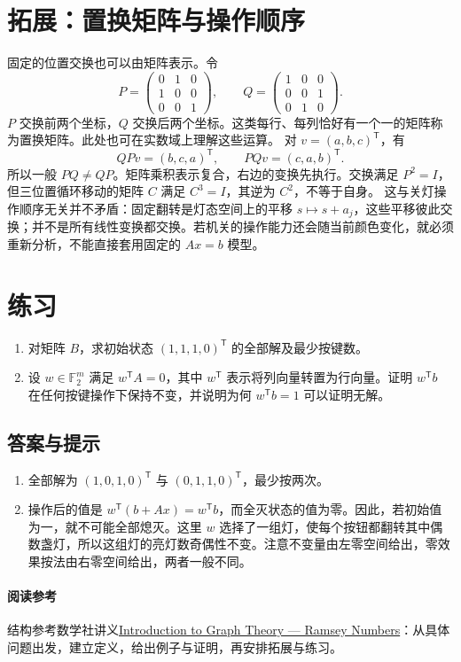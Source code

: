 \documentclass[UTF8,fontset=fandol,11pt,a4paper]{ctexart}
\newcommand{\F}{\mathbb F_2}
\begin{document}
\section{拓展：置换矩阵与操作顺序}
固定的位置交换也可以由矩阵表示。令
\[
 P=\begin{pmatrix}0&1&0\\1&0&0\\0&0&1\end{pmatrix},\qquad
 Q=\begin{pmatrix}1&0&0\\0&0&1\\0&1&0\end{pmatrix}.
\]
$P$ 交换前两个坐标，$Q$ 交换后两个坐标。这类每行、每列恰好有一个一的矩阵称为置换矩阵。此处也可在实数域上理解这些运算。
对 $v=(a,b,c)^{\mathsf T}$，有
\[QPv=(b,c,a)^{\mathsf T},\qquad PQv=(c,a,b)^{\mathsf T}.\]
所以一般 $PQ\ne QP$。矩阵乘积表示复合，右边的变换先执行。交换满足 $P^2=I$，但三位置循环移动的矩阵 $C$ 满足 $C^3=I$，其逆为 $C^2$，不等于自身。
这与关灯操作顺序无关并不矛盾：固定翻转是灯态空间上的平移 $s\mapsto s+a_j$，这些平移彼此交换；并不是所有线性变换都交换。若机关的操作能力还会随当前颜色变化，就必须重新分析，不能直接套用固定的 $Ax=b$ 模型。
\section{练习}
\begin{enumerate}
\item 对矩阵 $B$，求初始状态 $(1,1,1,0)^{\mathsf T}$ 的全部解及最少按键数。
\item 设 $w\in\F^m$ 满足 $w^{\mathsf T}A=0$，其中 $w^{\mathsf T}$ 表示将列向量转置为行向量。证明 $w^{\mathsf T}b$ 在任何按键操作下保持不变，并说明为何 $w^{\mathsf T}b=1$ 可以证明无解。
\end{enumerate}
\subsection*{答案与提示}
\begin{enumerate}
\item 全部解为 $(1,0,1,0)^{\mathsf T}$ 与 $(0,1,1,0)^{\mathsf T}$，最少按两次。
\item 操作后的值是 $w^{\mathsf T}(b+Ax)=w^{\mathsf T}b$，而全灭状态的值为零。因此，若初始值为一，就不可能全部熄灭。这里 $w$ 选择了一组灯，使每个按钮都翻转其中偶数盏灯，所以这组灯的亮灯数奇偶性不变。注意不变量由左零空间给出，零效果按法由右零空间给出，两者一般不同。
\end{enumerate}
\paragraph{阅读参考}
结构参考数学社讲义\href{https://ph-ormula.github.io/math-talks/ramsey-numbers/}{Introduction to Graph Theory --- Ramsey Numbers}：从具体问题出发，建立定义，给出例子与证明，再安排拓展与练习。
\end{document}
